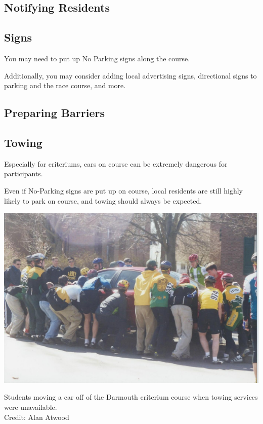 \documentclass[
  letterpaper, %
  fontsize=10pt, %
  twoside=true,
  chapterentrydots=true, %
  numbers=noenddot,
  fontmethod=tex,
]{kaobook}
\begin{document}
\subsection{Notifying Residents}

\subsection{Signs}

You may need to put up No Parking signs along the course.

Additionally, you may consider adding local advertising signs,
directional signs to parking and the race course, and more.

\subsection{Preparing Barriers}

\subsection{Towing}

Especially for criteriums, %
cars on course can be extremely dangerous for participants.

Even if No-Parking signs %
are put up on course, local residents are still highly likely to park on course,
and towing should always be expected.

\begin{marginfigure}
\includegraphics{dartmouth_car.jpg}
\caption[Students moving a car off a criterium course]{
          Students moving a car off of the Darmouth criterium course
          when towing services were unavailable.\\
          Credit: Alan Atwood}
\end{marginfigure}
\end{document}
